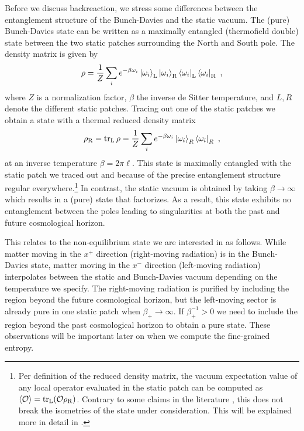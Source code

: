 \documentclass[a4paper,11pt]{article}
\newcommand{\beq}{\begin{equation}}
\newcommand{\eeq}{\end{equation}}
\numberwithin{equation}{section}
\begin{document}
Before we discuss backreaction, we stress some differences between the entanglement structure of the Bunch-Davies and the static vacuum. The (pure) Bunch-Davies state can be written as a maximally entangled (thermofield double) state between the two static patches surrounding the North and South pole. The density matrix is given by \cite{Goheer:2002vf}
\beq
\rho = \frac1Z\sum_i e^{-\beta \omega_i} \ket{\omega_i}_{\rm L}\ket{\omega_i}_{\rm R}\bra{\omega_i}_{\rm L}\bra{\omega_i}_{\rm R} ~,
\eeq
where $Z$ is a normalization factor, $\beta$ the inverse de Sitter temperature, and $L,R$ denote the different static patches. Tracing out one of the static patches we obtain a state with a thermal reduced density matrix
\beq
\rho_{\rm R} = \text{tr}_{\rm L}\,\rho = \frac1Z \sum_i e^{-\beta \omega_i}\ket{\omega_i}_R\bra{\omega_i}_R ~,
\eeq
at an inverse temperature $\beta = 2\pi\ell$. This state is maximally entangled with the static patch we traced out and because of the precise entanglement structure regular everywhere.\footnote{Per definition of the reduced density matrix, the vacuum expectation value of any local operator evaluated in the static patch can be computed as $\braket{{\cal O}}=\text{tr}_{\rm L}({\cal O}\rho_{\rm R})$. Contrary to some claims in the literature \cite{Markkanen:2017abw,Blumenhagen:2020doa}, this does not break the isometries of the state under consideration. This will be explained more in detail in \cite{Aalsma:2021xxx}.} In contrast, the static vacuum is obtained by taking $\beta \to \infty$ which results in a (pure) state that factorizes. As a result, this state exhibits no entanglement between the poles leading to singularities at both the past and future cosmological horizon.

This relates to the non-equilibrium state we are interested in as follows. While matter moving in the $x^+$ direction (right-moving radiation) is in the Bunch-Davies state, matter moving in the $x^-$ direction (left-moving radiation) interpolates between the static and Bunch-Davies vacuum depending on the temperature we specify. The right-moving radiation is purified by including the region beyond the future cosmological horizon, but the left-moving sector is already pure in one static patch when $\beta_+\to\infty$. If $\beta_+^{-1}>0$ we need to include the region beyond the past cosmological horizon to obtain a pure state. These observations will be important later on when we compute the fine-grained entropy.
\end{document}
